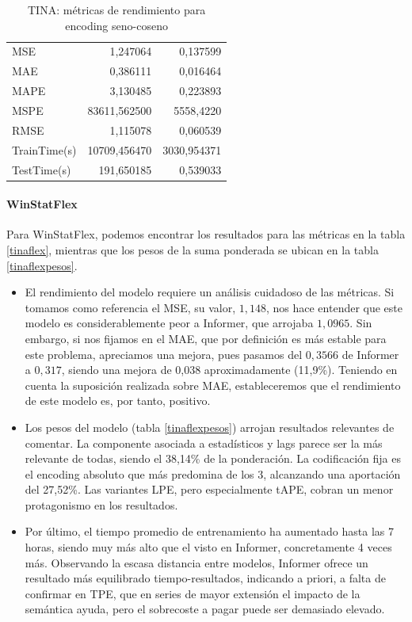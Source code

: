 \begin{table}[!ht]
	\centering
	\begin{tabular}{l|N|N}
		\toprule
		 &  &  \\
		\midrule
		MSE & 1,247064 & 0,137599 \\
		MAE & 0,386111 & 0,016464 \\
		MAPE & 3,130485 & 0,223893 \\
		MSPE & 83611,562500 & 5558,4220 \\
		RMSE & 1,115078 & 0,060539 \\
		TrainTime(s) & 10709,456470 & 3030,954371 \\
		TestTime(s) & 191,650185 & 0,539033 \\
		\bottomrule
	\end{tabular}
	\caption{TINA: métricas de rendimiento para encoding seno-coseno}
	\label{tinasincos}
\end{table}

\paragraph{WinStatFlex}

Para WinStatFlex, podemos encontrar los resultados para las métricas en la tabla \ref{tinaflex}, mientras que los pesos de la suma ponderada se ubican en la tabla \ref{tinaflexpesos}.

\begin{itemize}
	\item El rendimiento del modelo requiere un análisis cuidadoso de las métricas. Si tomamos como referencia el MSE, su valor, $1,148$, nos hace entender que este modelo es considerablemente peor a Informer, que arrojaba $1,0965$. Sin embargo, si nos fijamos en el MAE, que por definición es más estable para este problema, apreciamos una mejora, pues pasamos del $0,3566$ de Informer a $0,317$, siendo una mejora de 0,038 aproximadamente (11,9\%). Teniendo en cuenta la suposición realizada sobre MAE, estableceremos que el rendimiento de este modelo es, por tanto, positivo.
	
	\item Los pesos del modelo (tabla \ref{tinaflexpesos}) arrojan resultados relevantes de comentar. La componente asociada a estadísticos y lags parece ser la más relevante de todas, siendo el 38,14\% de la ponderación. La codificación fija es el encoding absoluto que más predomina de los 3, alcanzando una aportación del 27,52\%. Las variantes LPE, pero especialmente tAPE, cobran un menor protagonismo en los resultados.
	
	\item Por último, el tiempo promedio de entrenamiento ha aumentado hasta las 7 horas, siendo muy más alto que el visto en Informer, concretamente 4 veces más. Observando la escasa distancia entre modelos, Informer ofrece un resultado más equilibrado tiempo-resultados, indicando a priori, a falta de confirmar en TPE, que en series de mayor extensión el impacto de la semántica ayuda, pero el sobrecoste a pagar puede ser demasiado elevado.
\end{itemize}
 
